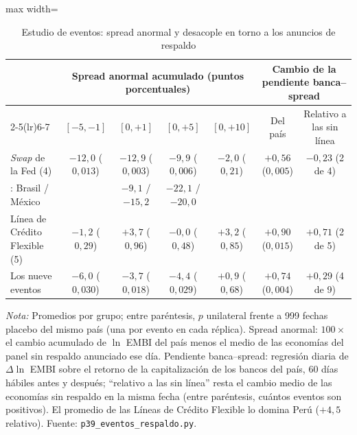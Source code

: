 \begin{table}[htbp]
\centering
\small
\caption[Estudio de eventos del respaldo externo]{Estudio de eventos: spread anormal y desacople en torno a los anuncios de respaldo}
\label{tab:eventos}
\begin{adjustbox}{max width=\linewidth}
\begin{tabular}{l cccc cc}
\toprule
 & \multicolumn{4}{c}{Spread anormal acumulado (puntos porcentuales)} & \multicolumn{2}{c}{Cambio de la pendiente banca--spread} \\
\cmidrule(lr){2-5}\cmidrule(lr){6-7}
 & $[-5,-1]$ & $[0,+1]$ & $[0,+5]$ & $[0,+10]$ & Del país & Relativo a las sin línea \\
\midrule
\textit{Swap} de la Fed (4) & $-12{,}0$ ($0{,}013$) & $-12{,}9$ ($0{,}003$) & $-9{,}9$ ($0{,}006$) & $-2{,}0$ ($0{,}21$) & $+0{,}56$ ($0{,}005$) & $-0{,}23$ (2 de 4) \\
\quad 2020: Brasil / México & & $-9{,}1$ / $-15{,}2$ & $-22{,}1$ / $-20{,}0$ & & & \\
Línea de Crédito Flexible (5) & $-1{,}2$ ($0{,}29$) & $+3{,}7$ ($0{,}96$) & $-0{,}0$ ($0{,}48$) & $+3{,}2$ ($0{,}85$) & $+0{,}90$ ($0{,}015$) & $+0{,}71$ (2 de 5) \\
Los nueve eventos & $-6{,}0$ ($0{,}030$) & $-3{,}7$ ($0{,}018$) & $-4{,}4$ ($0{,}029$) & $+0{,}9$ ($0{,}68$) & $+0{,}74$ ($0{,}004$) & $+0{,}29$ (4 de 9) \\
\bottomrule
\end{tabular}
\end{adjustbox}
\par\smallskip\parbox{0.95\linewidth}{\footnotesize \textit{Nota:} Promedios por grupo; entre paréntesis, $p$ unilateral frente a 999 fechas placebo del mismo país (una por evento en cada réplica). Spread anormal: $100\times$ el cambio acumulado de $\ln$ EMBI del país menos el medio de las economías del panel sin respaldo anunciado ese día. Pendiente banca--spread: regresión diaria de $\Delta\ln$ EMBI sobre el retorno de la capitalización de los bancos del país, 60 días hábiles antes y después; ``relativo a las sin línea'' resta el cambio medio de las economías sin respaldo en la misma fecha (entre paréntesis, cuántos eventos son positivos). El promedio de las Líneas de Crédito Flexible lo domina Perú ($+4{,}5$ relativo). Fuente: \texttt{p39\_eventos\_respaldo.py}.}
\end{table}

